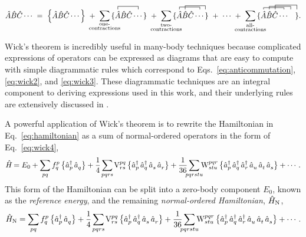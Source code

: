 \documentclass[thesis.tex]{subfiles}
\begin{document}
\begin{equation} \label{eq:wick4}
  \hat{A}\hat{B}\hat{C}\cdots\ =\ \normord{\hat{A}\hat{B}\hat{C}\cdots}\
  +\ \sum_{\mathclap{\substack{\text{one-} \\ \text{contractions}}}}
  \contraction[1.0ex]{\{ }{\hat{A}}{\hat{B}\hat{C}}{\cdots}
  \{ \hat{A}\hat{B}\hat{C}\cdots \}\
  +\ \sum_{\mathclap{\substack{\text{two-} \\ \text{contractions}}}}
  \contraction[0.8ex]{\{ }{\hat{A}}{\hat{B}\hat{C}}{\cdots}
  \contraction[1.2ex]{\{ \hat{A}}{\hat{B}}{\hat{C}\cdots}{}
  \{ \hat{A}\hat{B}\hat{C}\cdots \}\
  +\ \cdots\ +\ \sum_{\mathclap{\substack{\text{all-} \\ \text{contractions}}}}
  \contraction[0.6ex]{\{ }{\hat{A}}{\hat{B}\hat{C}}{\cdots}
  \contraction[1.0ex]{\{ \hat{A}}{\hat{B}}{\hat{C}\cdots}{\ }
  \contraction[1.4ex]{\{ \hat{A}\hat{B}}{\hat{C}}{\cdots\ \ \ }{}
  \{ \hat{A}\hat{B}\hat{C}\cdots\ \ \ \}.
\end{equation}

Wick's theorem is incredibly useful in many-body techniques because complicated expressions of operators can be expressed as diagrams that are easy to compute with simple diagrammatic rules which correspond to Eqs.\ \eqref{eq:anticommutation},\eqref{eq:wick2}, and \eqref{eq:wick3}.  These diagrammatic techniques are an integral component to deriving expressions used in this work, and their underlying rules are extensively discussed in \cite{SHAVITT2009}.

A powerful application of Wick's theorem is to rewrite the Hamiltonian in Eq.\ \eqref{eq:hamiltonian} as a sum of normal-ordered operators in the form of Eq.\ \eqref{eq:wick4},
\begin{equation} \label{eq:HamN}
  \Ham = E_{0} + \sum_{\mathclap{pq}}\fint{p}{q}\normord{\co{p}\ao{q}} + \frac{1}{4}\sum_{\mathclap{pqrs}}\vint{pq}{rs}\normord{\co{p}\co{q}\ao{s}\ao{r}} + \frac{1}{36}\sum_{\mathclap{pqrstu}}\wint{pqr}{stu}\normord{\co{p}\co{q}\co{r}\ao{u}\ao{t}\ao{s}} + \cdots.
\end{equation}
This form of the Hamiltonian can be split into a zero-body component $E_{0}$, known as the \textit{reference energy}, and the remaining \textit{normal-ordered Hamiltonian}, $\hat{H}_{\mathrm{N}}$,
\begin{equation} \label{eq:HamN1}
  \HamN = \sum_{\mathclap{pq}}\fint{p}{q}\normord{\co{p}\ao{q}} + \frac{1}{4}\sum_{\mathclap{pqrs}}\vint{pq}{rs}\normord{\co{p}\co{q}\ao{s}\ao{r}} + \frac{1}{36}\sum_{\mathclap{pqrstu}}\wint{pqr}{stu}\normord{\co{p}\co{q}\co{r}\ao{u}\ao{t}\ao{s}} + \cdots.
\end{equation}
\end{document}
